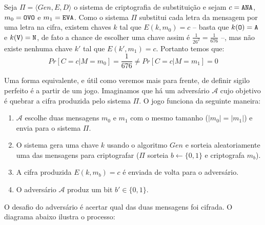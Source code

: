 \begin{example}
  Seja $\Pi = \langle Gen, E, D \rangle$ o sistema de criptografia de substituição e sejam $c = \textrm{\tt ANA}$, $m_0 = \textrm{\tt OVO}$ e $m_1 = \textrm{\tt EVA}$.
Como o sistema $\Pi$ substitui cada letra da mensagem por uma letra na cifra, existem chaves $k$ tal que $E(k, m_0) = c$ -- basta que $k(\textrm{\tt O}) = \textrm{\tt A}$ e $k(\textrm{\tt V}) = \textrm{\tt N}$, de fato a chance de escolher uma chave assim é $\frac{1}{26^2} = \frac{1}{676}$ --, mas não existe nenhuma chave $k'$ tal que $E(k', m_1) = c$.
Portanto temos que:
\begin{displaymath}
Pr[C = c | M = m_0] =  \frac{1}{676} \neq Pr[C = c | M = m_1] = 0  
\end{displaymath}
\end{example}

Uma forma equivalente, e útil como veremos mais para frente, de definir sigilo perfeito é a partir de um jogo.
Imaginamos que há um adversário $\mathcal{A}$ cujo objetivo é quebrar a cifra produzida pelo sistema $\Pi$.
O jogo funciona da seguinte maneira: 
\begin{enumerate}
\item $\mathcal{A}$ escolhe duas mensagens $m_0$ e $m_1$ com o mesmo tamanho ($|m_0| = |m_1|$) e envia para o sistema $\Pi$.
\item O sistema gera uma chave $k$ usando o algoritmo $Gen$ e sorteia aleatoriamente uma das mensagens para criptografar ($\Pi$ sorteia $b \leftarrow \{0, 1\}$ e criptografa $m_b$).
\item A cifra produzida $E(k, m_b) = c$ é enviada de volta para o adversário.
\item O adversário $\mathcal{A}$ produz um bit $b' \in \{0,1\}$.
\end{enumerate}

O desafio do adversário é acertar qual das duas mensagens foi cifrada.
O diagrama abaixo ilustra o processo:

\begin{center}
\end{center}

